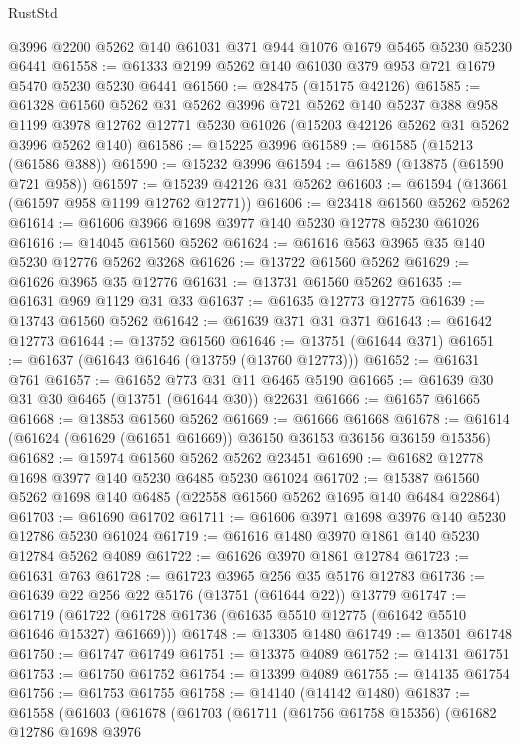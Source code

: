 \begin{lexlean}{RustStd}
\begin{coremodule}
    @3996
    @2200
    @5262
    @140
    @61031
    @371
    @944
    @1076
    @1679
    @5465
    @5230
    @5230
    @6441
@61558 := @61333 @2199 @5262 @140 @61030 @379 @953 @721 @1679 @5470 @5230 @5230 @6441
@61560 := @28475 (@15175 @42126)
@61585 := @61328
    @61560
    @5262
    @31
    @5262
    @3996
    @721
    @5262
    @140
    @5237
    @388
    @958
    @1199
    @3978
    @12762
    @12771
    @5230
    @61026
    (@15203 @42126 @5262 @31 @5262 @3996 @5262 @140)
@61586 := @15225 @3996
@61589 := @61585 (@15213 (@61586 @388))
@61590 := @15232 @3996
@61594 := @61589 (@13875 (@61590 @721 @958))
@61597 := @15239 @42126 @31 @5262
@61603 := @61594 (@13661 (@61597 @958 @1199 @12762 @12771))
@61606 := @23418 @61560 @5262 @5262
@61614 := @61606 @3966 @1698 @3977 @140 @5230 @12778 @5230 @61026
@61616 := @14045 @61560 @5262
@61624 := @61616 @563 @3965 @35 @140 @5230 @12776 @5262 @3268
@61626 := @13722 @61560 @5262
@61629 := @61626 @3965 @35 @12776
@61631 := @13731 @61560 @5262
@61635 := @61631 @969 @1129 @31 @33
@61637 := @61635 @12773 @12775
@61639 := @13743 @61560 @5262
@61642 := @61639 @371 @31 @371
@61643 := @61642 @12773
@61644 := @13752 @61560
@61646 := @13751 (@61644 @371)
@61651 := @61637 (@61643 @61646 (@13759 (@13760 @12773)))
@61652 := @61631 @761
@61657 := @61652 @773 @31 @11 @6465 @5190
@61665 := @61639 @30 @31 @30 @6465 (@13751 (@61644 @30)) @22631
@61666 := @61657 @61665
@61668 := @13853 @61560 @5262
@61669 := @61666 @61668
@61678 := @61614 (@61624 (@61629 (@61651 @61669)) @36150 @36153 @36156 @36159 @15356)
@61682 := @15974 @61560 @5262 @5262 @23451
@61690 := @61682 @12778 @1698 @3977 @140 @5230 @6485 @5230 @61024
@61702 := @15387 @61560 @5262 @1698 @140 @6485 (@22558 @61560 @5262 @1695 @140 @6484 @22864)
@61703 := @61690 @61702
@61711 := @61606 @3971 @1698 @3976 @140 @5230 @12786 @5230 @61024
@61719 := @61616 @1480 @3970 @1861 @140 @5230 @12784 @5262 @4089
@61722 := @61626 @3970 @1861 @12784
@61723 := @61631 @763
@61728 := @61723 @3965 @256 @35 @5176 @12783
@61736 := @61639 @22 @256 @22 @5176 (@13751 (@61644 @22)) @13779
@61747 := @61719 (@61722 (@61728 @61736 (@61635 @5510 @12775 (@61642 @5510 @61646 @15327) @61669)))
@61748 := @13305 @1480
@61749 := @13501 @61748
@61750 := @61747 @61749
@61751 := @13375 @4089
@61752 := @14131 @61751
@61753 := @61750 @61752
@61754 := @13399 @4089
@61755 := @14135 @61754
@61756 := @61753 @61755
@61758 := @14140 (@14142 @1480)
@61837 := @61558
    (@61603
      (@61678
        (@61703
          (@61711
            (@61756 @61758 @15356)
            (@61682
              @12786
              @1698
              @3976

\end{coremodule}
\end{lexlean}
